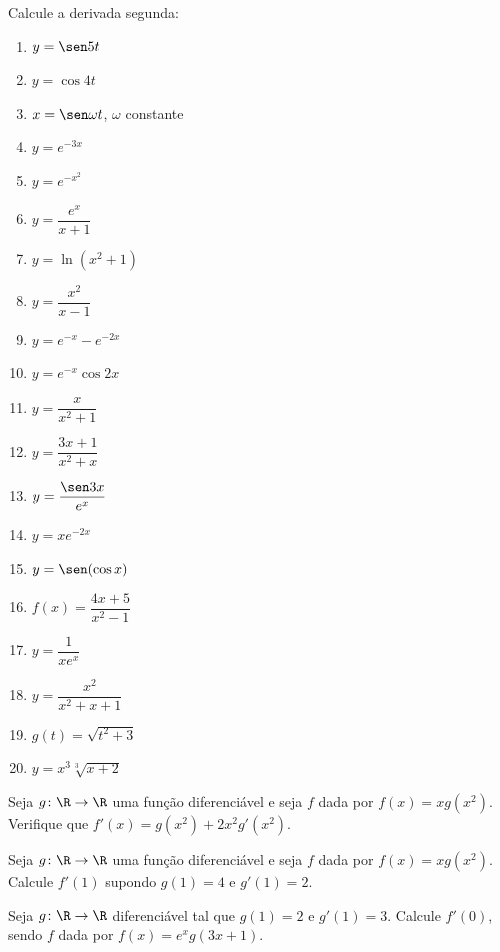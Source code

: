 \begin{exercicio}[5]
Calcule a derivada segunda:
\begin{enumerate}[label=\alph*)]
    \item $y = \sen 5t$
    \item $y = \cos 4t$
    \item $x = \sen\omega t$, $\omega$ constante
    \item $y = e^{-3x}$
    \item $y = e^{-x^2}$
    \item $y = \dfrac{e^x}{x + 1}$
    \item $y = \ln(x^2 + 1)$
    \item $y = \dfrac{x^2}{x - 1}$
    \item $y = e^{-x} - e^{-2x}$
    \item $y = e^{-x}\cos 2x$
    \item $y = \dfrac{x}{x^2 + 1}$
    \item $y = \dfrac{3x + 1}{x^2 + x}$
    \item $y = \dfrac{\sen 3x}{e^x}$
    \item $y = xe^{-2x}$
    \item $y = \sen(\cos x)$
    \item $f(x) = \dfrac{4x + 5}{x^2 - 1}$
    \item $y = \dfrac{1}{xe^x}$
    \item $y = \dfrac{x^2}{x^2 + x + 1}$
    \item $g(t) = \sqrt{t^2 + 3}$
    \item $y = x^3 \sqrt[3]{x + 2}$
\end{enumerate}
\end{exercicio}

\begin{exercicio}[6]
Seja $g\colon \R \to \R$ uma função diferenciável e seja $f$ dada por $f(x) = xg(x^2)$. Verifique que $f'(x) = g(x^2) + 2x^2 g'(x^2)$.
\end{exercicio}

\begin{exercicio}[7]
Seja $g\colon \R \to \R$ uma função diferenciável e seja $f$ dada por $f(x) = xg(x^2)$. Calcule $f'(1)$ supondo $g(1) = 4$ e $g'(1) = 2$.
\end{exercicio}

\begin{exercicio}[8]
Seja $g\colon \R \to \R$ diferenciável tal que $g(1) = 2$ e $g'(1) = 3$. Calcule $f'(0)$, sendo $f$ dada por $f(x) = e^x g(3x + 1)$.
\end{exercicio}

